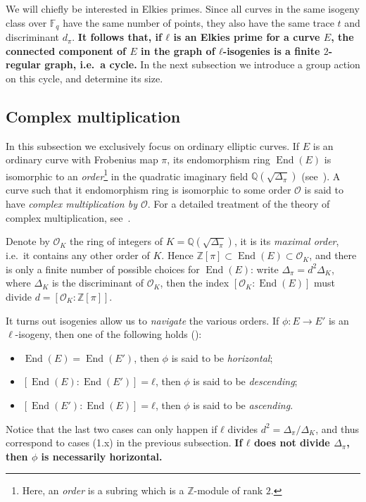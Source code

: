 \documentclass{article}
\newcommand{\F}{\mathbb{F}}
\renewcommand{\O}{\mathcal{O}}
\theoremstyle{definition}
\DeclareMathOperator{\End}{End}
\begin{document}
We will chiefly be interested in Elkies primes. Since all curves in
the same isogeny class over $\F_q$ have the same number of points,
they also have the same trace $t$ and discriminant $d_π$.
\textbf{It follows that, if $ℓ$ is an Elkies prime for a curve $E$,
  the connected component of $E$ in the graph of $ℓ$-isogenies is a
  finite $2$-regular graph, i.e.\ a cycle.} In the next subsection we
introduce a group action on this cycle, and determine its size.


\subsection{Complex multiplication}

In this subsection we exclusively focus on ordinary elliptic
curves. If $E$ is an ordinary curve with Frobenius map $π$, its
endomorphism ring $\End(E)$ is isomorphic to an
\emph{order}\footnote{Here, an \emph{order} is a subring which is a
  $ℤ$-module of rank $2$.} in the quadratic imaginary field
$ℚ(\sqrt{Δ_π})$ (see~\cite[III.9]{silverman:elliptic}).  A curve such
that it endomorphism ring is isomorphic to some order $\O$ is said to
have \emph{complex multiplication by $\O$}.  For a detailed treatment
of the theory of complex multiplication,
see~\cite{lang1987elliptic,silverman:advanced}.

Denote by $\O_K$ the ring of integers of $K=ℚ(\sqrt{Δ_π})$, it is its
\emph{maximal order}, i.e.\ it contains any other order of $K$.  Hence
$ℤ[π]⊂\End(E)⊂\O_K$, and there is only a finite number of possible
choices for $\End(E)$: write $Δ_π=d^2Δ_K$, where $Δ_K$ is the
discriminant of $\O_K$, then the index $[\O_K:\End(E)]$ must divide
$d=[\O_K:ℤ[π]]$.

It turns out isogenies allow us to \emph{navigate} the various
orders. If $ϕ:E→E'$ is an $\ell$-isogeny, then one of the following
holds (\cite[Prop.~21]{kohel}):
\begin{itemize}
\item $\End(E) = \End(E')$, then $ϕ$ is said to be
  \emph{horizontal};
\item $[\End(E):\End(E')] = ℓ$, then $ϕ$ is said to be
  \emph{descending};
\item $[\End(E'):\End(E)] = ℓ$, then $ϕ$ is said to be
  \emph{ascending}.
\end{itemize}
Notice that the last two cases can only happen if $ℓ$ divides
$d^2=Δ_π/Δ_K$, and thus correspond to cases (1.x) in the previous
subsection.
\textbf{If $ℓ$ does not divide $Δ_π$, then $ϕ$ is necessarily
  horizontal.}
\end{document}
